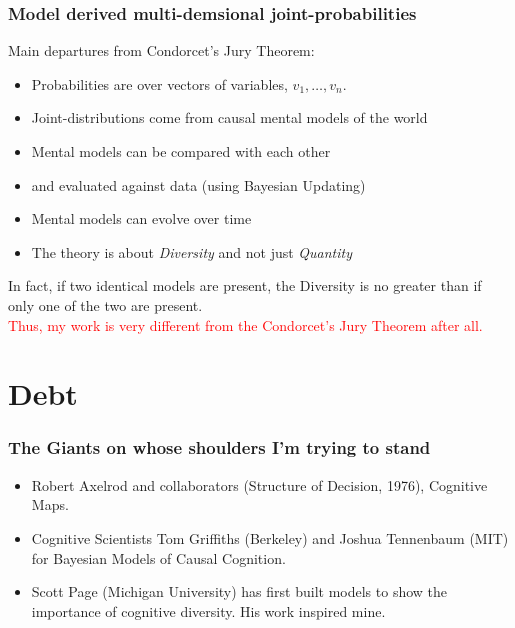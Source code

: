 \documentclass{beamer}
\begin{document}
\begin{frame}
\frametitle{Model derived multi-demsional joint-probabilities}
Main departures from Condorcet's Jury Theorem:
\begin{itemize}
\item Probabilities are over vectors of variables, $v_1, \ldots, v_n$.
\item Joint-distributions come from causal mental models of the world
\item Mental models can be compared with each other
\item and evaluated against data (using Bayesian Updating)
\item Mental models can evolve over time
\item The theory is about \textit{Diversity} and not just \textit{Quantity}
\end{itemize}
In fact, if two identical models are present, the Diversity is no greater than if only one of the two are present.\\
\textcolor{red}{Thus, my work is very different from the Condorcet's Jury Theorem after all.}
\end{frame}
\section{Debt}
\begin{frame}
\frametitle{The Giants on whose shoulders I'm trying to stand}
\begin{itemize}
\item Robert Axelrod and collaborators (Structure of Decision, 1976), Cognitive Maps.

\item Cognitive Scientists Tom Griffiths (Berkeley) and Joshua Tennenbaum (MIT) for Bayesian Models of Causal Cognition.

\item Scott Page (Michigan University) has first built models to show the importance of cognitive diversity. His work inspired mine.

\end{itemize}

\end{frame}
\end{document}

